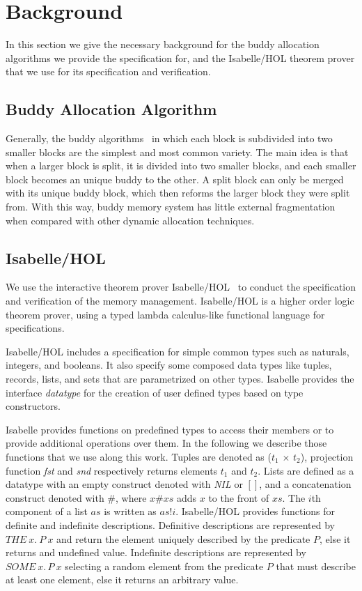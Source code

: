 \section{Background}
In this section we give the necessary background for the buddy allocation algorithms we provide the specification for, and the Isabelle/HOL theorem prover that we use for its specification and verification.

\subsection{Buddy Allocation Algorithm}
Generally, the buddy algorithms~\cite{reg_knowlton} in which each block is subdivided into two smaller blocks are the simplest and most common variety. The main idea is that when a larger block is split, it is divided into two smaller blocks, and each smaller block becomes an unique buddy to the other. A split block can only be merged with its unique buddy block, which then reforms the larger block they were split from. With this way, buddy memory system has little external fragmentation when compared with other dynamic allocation techniques.

\subsection{Isabelle/HOL}
We use the interactive theorem prover Isabelle/HOL~\cite{reg_Isabelle/HOL} to conduct the specification and verification of the memory management. Isabelle/HOL is a higher order logic theorem prover, using a typed lambda calculus-like functional language for specifications. 

Isabelle/HOL includes a specification for simple common types such as naturals, integers, and booleans. It also specify some composed data types like tuples, records, lists, and sets that are parametrized on other types. Isabelle provides the interface \emph{datatype} for the creation of user defined types based on type constructors. 

Isabelle provides functions on predefined types to access their members or to provide additional operations over them. In the following we describe those functions that we use along this work. Tuples are denoted as (\emph{$t_1$} $\times$ \emph{$t_2$}), projection function \emph{fst} and \emph{snd} respectively returns elements $t_1$ and $t_2$. Lists are defined as a datatype with an empty construct denoted with \emph{NIL} or $[]$, and a concatenation construct denoted with $\#$, where $x\#xs$ adds $x$ to the front of $xs$. The $i$th component of a list $as$ is written as $as!i$. Isabelle/HOL provides functions for definite and indefinite descriptions. Definitive descriptions are represented by $THE\ x.\ P\ x$ and return the element uniquely described by the predicate $P$, else it returns and undefined value. Indefinite descriptions are represented by $SOME\ x.\, P\ x$ selecting a random element from the predicate $P$ that must describe at least one element, else it returns an arbitrary value.

